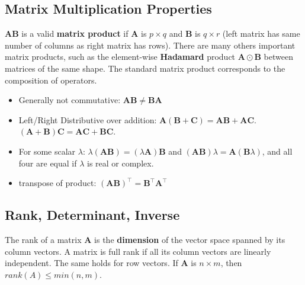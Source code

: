 \documentclass{harvardml}
\theoremstyle{definition}
\theoremstyle{plain}
\begin{document}
    \subsection{Matrix Multiplication Properties}
			$\mathbf{A}\mathbf{B}$ is a valid \textbf{matrix product}
			if $\mathbf{A}$ is $p \times q$ and $\mathbf{B}$ is $q \times r$
			(left matrix has same number of columns as right matrix has rows).
				  There are many others important matrix products,
				  such as the element-wise \textbf{Hadamard} product
				  $\mathbf{A} \odot \mathbf{B}$ between matrices of the same
				  shape. The standard matrix product corresponds to the 
				  composition of operators.
			\begin{itemize}
				\item Generally not commutative: 
					  $\mathbf{A}\mathbf{B} \neq \mathbf{B}\mathbf{A}$
            	\item Left/Right Distributive over addition:
					  $\mathbf{A}(\mathbf{B} + \mathbf{C}) = 
					  \mathbf{AB} + \mathbf{AC}$.
				  	  $(\mathbf{A} + \mathbf{B})\mathbf{C} = 
					  \mathbf{AC} + \mathbf{BC}$.
				\item For some scalar $\lambda$:
					$ \lambda(\mathbf{AB}) = 
					(\lambda\mathbf{A})\mathbf{B} $ and
					$ (\mathbf{AB})\lambda = \mathbf{A}
					(\mathbf{B}\lambda) $, 
                    and all four are equal if 
					$\lambda$ is real or complex.
				\item transpose of product:
					   $(\mathbf{AB})^\top = 
						\mathbf{B}^\top\mathbf{A}^\top$ 
			\end{itemize}

    
    \subsection{Rank, Determinant, Inverse}
		
		The rank of a matrix $\mathbf{A}$ is the \textbf{dimension} 
        of the vector space spanned by its column vectors. A matrix 
    	is full rank if all its column vectors are linearly independent. 
        The same holds for row vectors. If $\mathbf{A}$ is $n \times m$, 
        then $rank(A) \leq min(n,m)$.\\
\end{document}
